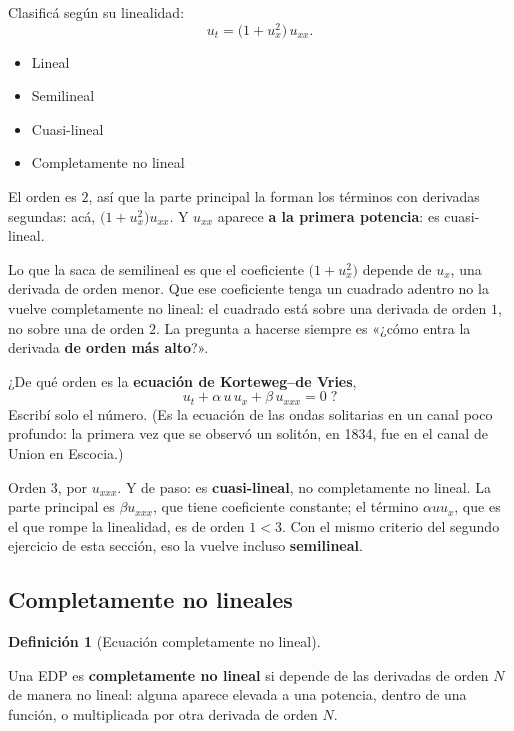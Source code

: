 \documentclass[
  spanish,
  a4paper,
]{scrbook}
\providecommand{\tightlist}{%
  \setlength{\itemsep}{0pt}\setlength{\parskip}{0pt}}
\theoremstyle{definition}
\newtheorem{definition}{Definición}[chapter]
\theoremstyle{plain}
\theoremstyle{definition}
\theoremstyle{plain}
\theoremstyle{definition}
\theoremstyle{remark}
\begin{document}
Clasificá según su linealidad: \[u_t = \big(1 + u_x^2\big)\,u_{xx}.\]

\begin{itemize}
\tightlist
\item
  {Lineal}
\item
  {Semilineal}
\item
  {Cuasi-lineal}
\item
  {Completamente no lineal}
\end{itemize}

El orden es \(2\), así que la parte principal la forman los términos con
derivadas segundas: acá, \(\big(1+u_x^2\big)u_{xx}\). Y \(u_{xx}\)
aparece \textbf{a la primera potencia}: es cuasi-lineal.

Lo que la saca de semilineal es que el coeficiente \(\big(1+u_x^2\big)\)
depende de \(u_x\), una derivada de orden menor. Que ese coeficiente
tenga un cuadrado adentro no la vuelve completamente no lineal: el
cuadrado está sobre una derivada de orden \(1\), no sobre una de orden
\(2\). La pregunta a hacerse siempre es «¿cómo entra la derivada
\textbf{de orden más alto}?».

¿De qué orden es la \textbf{ecuación de Korteweg--de Vries},
\[u_t + \alpha\,u\,u_x + \beta\,u_{xxx} = 0\;?\] Escribí solo el número.
(Es la ecuación de las ondas solitarias en un canal poco profundo: la
primera vez que se observó un solitón, en 1834, fue en el canal de Union
en Escocia.)

Orden \(3\), por \(u_{xxx}\). Y de paso: es \textbf{cuasi-lineal}, no
completamente no lineal. La parte principal es \(\beta u_{xxx}\), que
tiene coeficiente constante; el término \(\alpha u u_x\), que es el que
rompe la linealidad, es de orden \(1 < 3\). Con el mismo criterio del
segundo ejercicio de esta sección, eso la vuelve incluso
\textbf{semilineal}.

\subsection{Completamente no lineales}\label{sec-no-lineales}

\begin{definition}[Ecuación completamente no
lineal]\protect\hypertarget{def-no-lineal}{}\label{def-no-lineal}

Una EDP es \textbf{completamente no lineal} si depende de las derivadas
de orden \(N\) de manera no lineal: alguna aparece elevada a una
potencia, dentro de una función, o multiplicada por otra derivada de
orden \(N\).

\end{definition}
\end{document}

